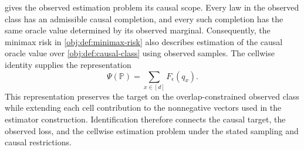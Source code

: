  gives the observed estimation problem its causal scope. Every law in the observed class has an admissible causal completion, and every such completion has the same oracle value determined by its observed marginal. Consequently, the minimax risk in \cref{obj:def:minimax-risk} also describes estimation of the causal oracle value over \cref{obj:def:causal-class} using observed samples. The cellwise identity supplies the representation
\[
\Psi(\mathbb P)=\sum_{x\in[d]}F_\epsilon(q_x).
\]
This representation preserves the target on the overlap-constrained observed class while extending each cell contribution to the nonnegative vectors used in the estimator construction. Identification therefore connects the causal target, the observed loss, and the cellwise estimation problem under the stated sampling and causal restrictions.
